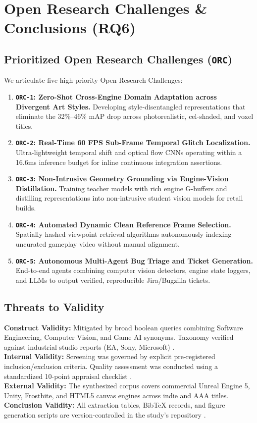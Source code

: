 \documentclass[preprint,12pt,3p]{elsarticle}
\begin{document}
\section{Open Research Challenges \& Conclusions (RQ6)}

\subsection{Prioritized Open Research Challenges (\texttt{ORC})}
We articulate five high-priority Open Research Challenges:
\begin{enumerate}
    \item \textbf{\texttt{ORC-1}: Zero-Shot Cross-Engine Domain Adaptation across Divergent Art Styles.} Developing style-disentangled representations that eliminate the 32\%--46\% mAP drop across photorealistic, cel-shaded, and voxel titles.
    \item \textbf{\texttt{ORC-2}: Real-Time 60 FPS Sub-Frame Temporal Glitch Localization.} Ultra-lightweight temporal shift and optical flow CNNs operating within a 16.6ms inference budget for inline continuous integration assertions.
    \item \textbf{\texttt{ORC-3}: Non-Intrusive Geometry Grounding via Engine-Vision Distillation.} Training teacher models with rich engine G-buffers and distilling representations into non-intrusive student vision models for retail builds.
    \item \textbf{\texttt{ORC-4}: Automated Dynamic Clean Reference Frame Selection.} Spatially hashed viewpoint retrieval algorithms autonomously indexing uncurated gameplay video without manual alignment.
    \item \textbf{\texttt{ORC-5}: Autonomous Multi-Agent Bug Triage and Ticket Generation.} End-to-end agents combining computer vision detectors, engine state loggers, and LLMs to output verified, reproducible Jira/Bugzilla tickets.
\end{enumerate}

\subsection{Threats to Validity}
\textbf{Construct Validity:} Mitigated by broad boolean queries combining Software Engineering, Computer Vision, and Game AI synonyms. Taxonomy verified against industrial studio reports (EA, Sony, Microsoft) \cite{taesiri2025videogameqa, lu2026howfarvlms, yu2026refglitch, rahman2023weaksupervision}.\\
\textbf{Internal Validity:} Screening was governed by explicit pre-registered inclusion/exclusion criteria. Quality assessment was conducted using a standardized 10-point appraisal checklist \cite{dyba2008empirical}.\\
\textbf{External Validity:} The synthesized corpus covers commercial Unreal Engine 5, Unity, Frostbite, and HTML5 canvas engines across indie and AAA titles.\\
\textbf{Conclusion Validity:} All extraction tables, BibTeX records, and figure generation scripts are version-controlled in the study's repository \cite{phuc2026gamevisualbugdetection}.
\end{document}
